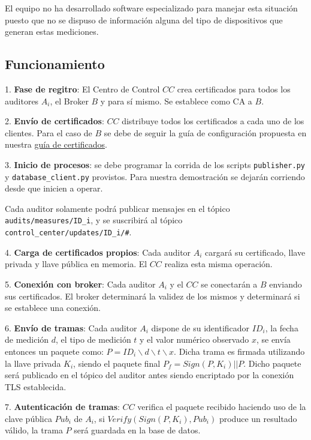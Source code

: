 \documentclass{article}
\begin{document}
            El equipo no ha desarrollado software especializado para manejar esta situación puesto que no se dispuso de información alguna del tipo de dispositivos que generan estas mediciones.

        \subsection{Funcionamiento}

            1. \textbf{Fase de regitro}: El Centro de Control $CC$ crea certificados para todos los auditores $A_i$, el Broker $B$ y para sí mismo. Se establece como CA a $B$.

            2. \textbf{Envío de certificados}: $CC$ distribuye todos los certificados a cada uno de los clientes. Para el caso de $B$ se debe de seguir la guía de configuración propuesta en nuestra \href{https://github.com/JuanEcheagaray75/licore-pki/blob/master/src/.test_certs/README.md}{guía de certificados}.

            3. \textbf{Inicio de procesos}: se debe programar la corrida de los scripts \texttt{publisher.py} y \texttt{database\_client.py} provistos. Para nuestra demostración se dejarán corriendo desde que inicien a operar.

            Cada auditor solamente podrá publicar mensajes en el tópico \texttt{audits/measures/ID\_i}, y se suscribirá al tópico \texttt{control\_center/updates/ID\_i/\#}.

            4. \textbf{Carga de certificados propios}: Cada auditor $A_i$ cargará su certificado, llave privada y llave pública en memoria. El $CC$ realiza esta misma operación.

            5. \textbf{Conexión con broker}: Cada auditor $A_i$ y el $CC$ se conectarán a $B$ enviando sus certificados. El broker determinará la validez de los mismos y determinará si se establece una conexión.

            6. \textbf{Envío de tramas}: Cada auditor $A_i$ dispone de su identificador $ID_i$, la fecha de medición $d$, el tipo de medición $t$ y el valor numérico observado $x$, se envía entonces un paquete como: $P = ID_i \backslash d \backslash t \backslash x$. Dicha trama es firmada utilizando la llave privada $K_i$, siendo el paquete final $P_f = Sign(P, K_i) || P$. Dicho paquete será publicado en el tópico del auditor antes siendo encriptado por la conexión TLS establecida.

            7. \textbf{Autenticación de tramas}: $CC$ verifica el paquete recibido haciendo uso de la clave pública $Pub_i$ de $A_i$, si $Verify(Sign(P, K_i), Pub_i)$ produce un resultado válido, la trama $P$ será guardada en la base de datos.
\end{document}
